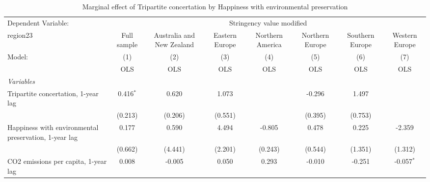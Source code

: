 
\begin{table}[htbp]
   \caption{Marginal effect of Tripartite concertation by Happiness with environmental preservation}
   \centering
   \begin{tabular}{lccccccc}
      \toprule
      Dependent Variable: & \multicolumn{7}{c}{Stringency value modified}\\
      region23                                                                                    & Full sample   & Australia and New Zealand & Eastern Europe & Northern America & Northern Europe & Southern Europe & Western Europe \\   
      Model:                                                                                      & (1)           & (2)                       & (3)            & (4)              & (5)             & (6)             & (7)\\  
                                                                                                  &  OLS          & OLS                       & OLS            & OLS              & OLS             & OLS             & OLS\\  
      \midrule
      \emph{Variables}\\
      Tripartite concertation, 1-year lag                                                         & 0.416$^{*}$   & 0.620                     & 1.073          &                  & -0.296          & 1.497           &   \\   
                                                                                                  & (0.213)       & (0.206)                   & (0.551)        &                  & (0.395)         & (0.753)         &   \\   
      Happiness with environmental preservation, 1-year lag                                       & 0.177         & 0.590                     & 4.494          & -0.805           & 0.478           & 0.225           & -2.359\\   
                                                                                                  & (0.662)       & (4.441)                   & (2.201)        & (0.243)          & (0.544)         & (1.351)         & (1.312)\\   
      CO2 emissions per capita, 1-year lag                                                        & 0.008         & -0.005                    & 0.050          & 0.293            & -0.010          & -0.251          & -0.057$^{*}$\\   

\end{tabular}
\end{table}
